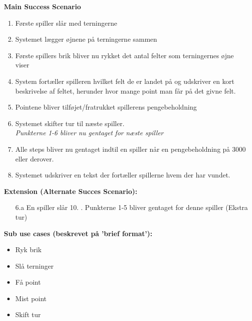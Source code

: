 \documentclass{article}
\begin{document}
\textbf{Main Success Scenario}
\begin{enumerate}
\itemsep-0.5em
    \item Første spiller slår med terningerne
    \item Systemet lægger øjnene på terningerne sammen
    \item Første spillers brik bliver nu rykket det antal felter som terningernes øjne viser
    \item System fortæller spilleren hvilket felt de er landet på og udskriver en kort beskrivelse af feltet, herunder hvor mange point man får på det givne felt.
    \item Pointene bliver tilføjet/fratrukket spillerens pengebeholdning
    \item Systemet skifter tur til næste spiller.\\
    \textit{Punkterne 1-6 bliver nu gentaget for næste spiller}
    \item Alle steps bliver nu gentaget indtil en spiller når en pengebeholdning på 3000 eller derover.
    \item Systemet udskriver en tekst der fortæller spillerne hvem der har vundet.
\end{enumerate}
\textbf{Extension (Alternate Succes Scenario): }
\begin{enumerate}
    \item [6.a] En spiller slår 10.
    . Punkterne 1-5 bliver gentaget for denne spiller (Ekstra tur)
\end{enumerate}

\textbf{Sub use cases (beskrevet på 'brief format'):}
\begin{itemize}
    \item Ryk brik
    \item Slå terninger
    \item Få point
    \item Mist point
    \item Skift tur
\end{itemize}
\end{document}
